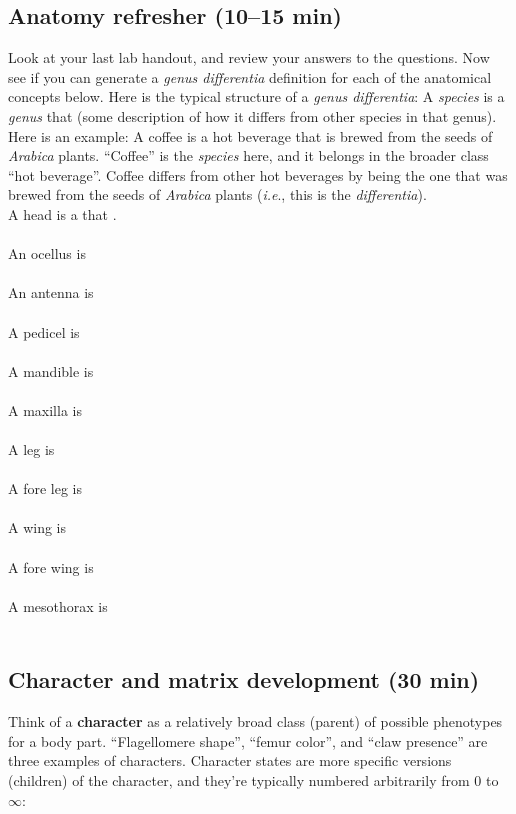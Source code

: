 \documentclass[letterpaper, 11pt]{article}
\begin{document}
\subsection{Anatomy refresher (10--15 min)}
Look at your last lab handout, and review your answers to the questions. Now see if you can generate a \textit{genus differentia} definition for each of the anatomical concepts below. Here is the typical structure of a \textit{genus differentia}: A \textit{species} is a \textit{genus} that (some description of how it differs from other species in that genus). Here is an example: A coffee is a hot beverage that is brewed from the seeds of \textit{Arabica} plants. ``Coffee'' is the \textit{species} here, and it belongs in the broader class ``hot beverage''. Coffee differs from other hot beverages by being the one that was brewed from the seeds of \textit{Arabica} plants (\textit{i.e}., this is the \textit{differentia}).\\

A head is a \makebox[30 mm]{\hrulefill} that \hrulefill.\\ \\

An ocellus is\\ \\

An antenna is\\ \\

A pedicel is\\ \\

A mandible is\\ \\

A maxilla is\\ \\

A leg is\\ \\

A fore leg is\\ \\

A wing is\\ \\

A fore wing is\\ \\

A mesothorax is\\ \\

\subsection{Character and matrix development (30 min)}
Think of a \textbf{character} as a relatively broad class (parent) of possible phenotypes for a body part. ``Flagellomere shape'', ``femur color'', and ``claw presence'' are three examples of characters. Character states are more specific versions (children) of the character, and they're typically numbered arbitrarily from 0 to $\infty$:\\
\end{document}

